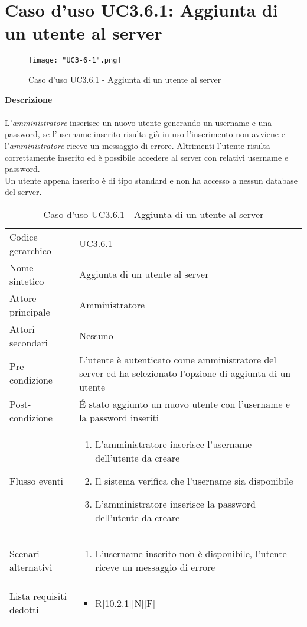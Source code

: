 \documentclass[a4paper]{report}
\begin{document}
	 \section{Caso d'uso UC3.6.1: Aggiunta di un utente al server}
	 \begin{figure}[H]
			\centering
			\texttt{[image: "UC3-6-1".png]}
			\caption{Caso d'uso UC3.6.1 - Aggiunta di un utente al server}
		\end{figure}
	 \textbf{Descrizione} \\ \\
	 L'\emph{amministratore} inserisce un nuovo utente generando un username e una password, se 
	 l'username inserito risulta già in uso l'inserimento non avviene e l'\emph{amministratore} riceve un
	 messaggio di errore. Altrimenti l'utente risulta correttamente inserito ed è possibile accedere al server
	 con relativi username e password. \\
	 Un utente appena inserito è di tipo standard e non ha accesso a nessun database del server.
		\begin{table}[H]
		\begin{tabularx}{\textwidth}{X | X}\toprule
			\rowcolor{orange!65}Codice gerarchico & UC3.6.1 \\
			Nome sintetico & Aggiunta di un utente al server \\
			\rowcolor{orange!65}Attore principale & Amministratore\\
			Attori secondari & Nessuno \\
			\rowcolor{orange!65}Pre-condizione & L'utente è autenticato come amministratore del server ed
			 ha selezionato l'opzione di aggiunta di un utente\\
			Post-condizione & \'E stato aggiunto un nuovo utente con l'username e la password inseriti\\
			\rowcolor{orange!65}Flusso eventi & \begin{enumerate}
			\item L'amministratore inserisce l'username dell'utente da creare
			\item Il sistema verifica che l'username sia disponibile
			\item L'amministratore inserisce la password dell'utente da creare
			\end{enumerate} \\
			Scenari alternativi & \begin{enumerate}
			\item L'username inserito non è disponibile, l'utente riceve un messaggio di errore
			\end{enumerate} \\
			\rowcolor{orange!65}Lista requisiti dedotti & \begin{itemize}
				\item R[10.2.1][N][F]
				\end{itemize} \\
			\bottomrule
		\end{tabularx}
		\caption{Caso d'uso UC3.6.1 - Aggiunta di un utente al server}
	 \end{table}
\end{document}
